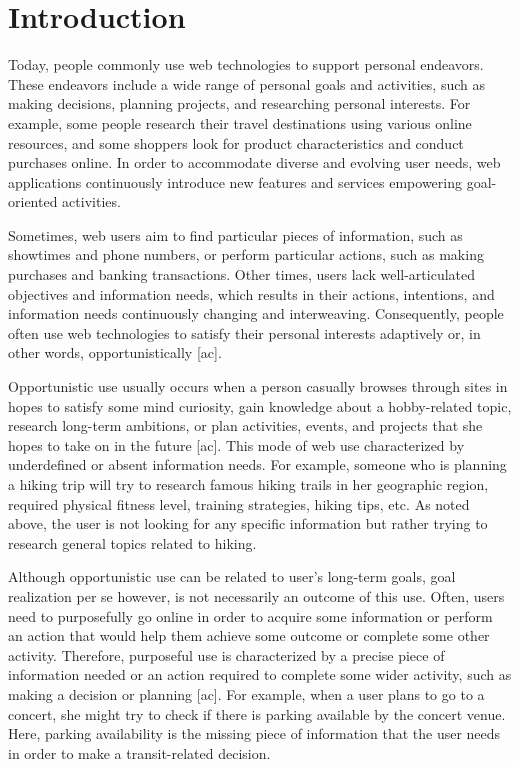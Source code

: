 \documentclass{casconpaper}
\begin{document}
{\section{Introduction}
Today, people commonly use web technologies to support personal endeavors. These endeavors include a wide range of personal goals and activities, such as making decisions, planning projects, and researching personal interests.  For example, some people research their travel destinations using various online resources, and some shoppers look for product characteristics and conduct purchases online. In order to accommodate diverse and evolving user needs, web applications continuously introduce new features and services empowering goal-oriented activities. 

Sometimes, web users aim to find particular pieces of information, such as showtimes and phone numbers, or perform particular actions, such as making purchases and banking transactions. Other times, users lack well-articulated objectives and information needs, which results in their actions, intentions, and information needs continuously changing and interweaving. Consequently, people often use web technologies to satisfy their personal interests adaptively or, in other words, opportunistically [ac]. 

Opportunistic use usually occurs when a person casually browses through sites in hopes to satisfy some mind curiosity, gain knowledge about a hobby-related topic, research long-term ambitions, or plan activities, events, and projects that she hopes to take on in the future [ac]. This mode of web use characterized by underdefined or absent information needs. For example, someone who is planning a hiking trip will try to research famous hiking trails in her geographic region, required physical fitness level, training strategies, hiking tips, etc. As noted above, the user is not looking for any specific information but rather trying to research general topics related to hiking. 

Although opportunistic use can be related to user's long-term goals, goal realization per se however, is not necessarily an outcome of this use. Often, users need to purposefully go online in order to acquire some information or perform an action that would help them achieve some outcome or complete some other activity. Therefore, purposeful use is characterized by a precise piece of information needed or an action required to complete some wider activity, such as making a decision or planning [ac]. For example, when a user plans to go to a concert, she might try to check if there is parking available by the concert venue.  Here, parking availability is the missing piece of information that the user needs in order to make a transit-related decision. 

}
\end{document}
